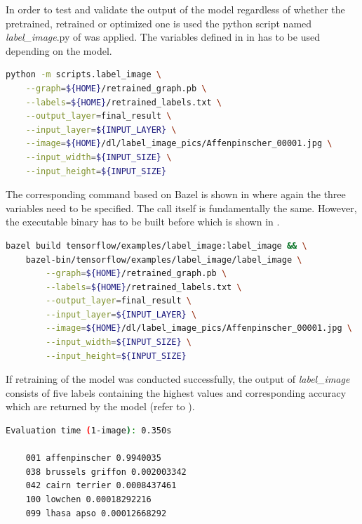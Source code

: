 In order to test and validate the output of the model regardless of whether the pretrained, retrained or optimized one is used the python script named \textit{label\_image}.py of \citep{TensorflowDemo} was applied. The variables defined in  in  has to be used depending on the model.

\begin{minipage}{\linewidth}
\begin{lstlisting}[caption=Call of \textit{label\_image.py}, label=list:label_image, language=bash]
	python -m scripts.label_image \
	--graph=${HOME}/retrained_graph.pb \
	--labels=${HOME}/retrained_labels.txt \
	--output_layer=final_result \
	--input_layer=${INPUT_LAYER} \
	--image=${HOME}/dl/label_image_pics/Affenpinscher_00001.jpg \
	--input_width=${INPUT_SIZE} \
	--input_height=${INPUT_SIZE}
\end{lstlisting}
\end{minipage}

The corresponding command based on Bazel is shown in  where again the three variables need to be specified. The call itself is fundamentally the same. However, the executable binary has to be built before which is shown in .

\begin{minipage}{\linewidth}
\begin{lstlisting}[caption=Build and call of \textit{label\_image}, label=list:blabel_image, language=bash]
	bazel build tensorflow/examples/label_image:label_image && \
	bazel-bin/tensorflow/examples/label_image/label_image \
		--graph=${HOME}/retrained_graph.pb \
		--labels=${HOME}/retrained_labels.txt \
		--output_layer=final_result \
		--input_layer=${INPUT_LAYER} \
		--image=${HOME}/dl/label_image_pics/Affenpinscher_00001.jpg \
		--input_width=${INPUT_SIZE} \
		--input_height=${INPUT_SIZE}
\end{lstlisting}
\end{minipage}

If retraining of the model was conducted successfully, the output of \textit{label\_image} consists of five labels containing the highest values and corresponding accuracy which are returned by the model (refer to ).

\begin{minipage}{\linewidth}
\begin{lstlisting}[caption=Output of \textit{label\_image.py}, label=list:label_imageOutput, language=bash]
	Evaluation time (1-image): 0.350s
	
	001 affenpinscher 0.9940035
	038 brussels griffon 0.002003342
	042 cairn terrier 0.0008437461
	100 lowchen 0.00018292216
	099 lhasa apso 0.00012668292
\end{lstlisting}
\end{minipage}




